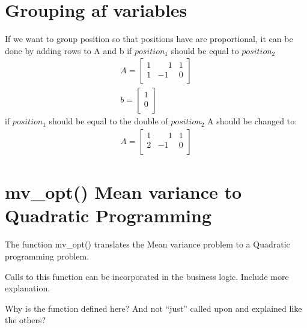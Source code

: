 \documentclass[letterpaper,10pt,english]{jupyterBook}
\begin{document}
\section{Grouping af variables}
\label{\detokenize{content/howto/optimization/Optimize_simpel:grouping-af-variables}}
\sphinxAtStartPar
If we want to group position so that positions have are proportional, it can be done by adding rows to A and b
if \(position_{1}\) should be equal to \(position_2\)
\begin{gather*}
A = \begin{bmatrix} 
		1 & \phantom{-}1 & 1 \\
		1 & -1 & 0 \\
		\end{bmatrix} \\        
         b = \begin{bmatrix} 
		1  \\
	    0 \\
		\end{bmatrix}
\end{gather*}
\sphinxAtStartPar
if \(position_{1}\) should be equal to the double of \(position_2\) A should be changed to:
\begin{gather*}
A = \begin{bmatrix} 
		1 & \phantom{-}1 & 1 \\
		2 &  -1 & 0 \\
		\end{bmatrix}
\end{gather*}

\section{mv\_opt() Mean variance to Quadratic Programming}
\label{\detokenize{content/howto/optimization/Optimize_simpel:mv-opt-mean-variance-to-quadratic-programming}}
\sphinxAtStartPar
The function mv\_opt() translates the Mean variance problem to a Quadratic programming problem.

\sphinxAtStartPar
Calls to this function can be incorporated in the business logic.   Include more explanation. 

\sphinxAtStartPar
 Why is the function defined here? And not “just” called upon and explained like the others? 
\end{document}
